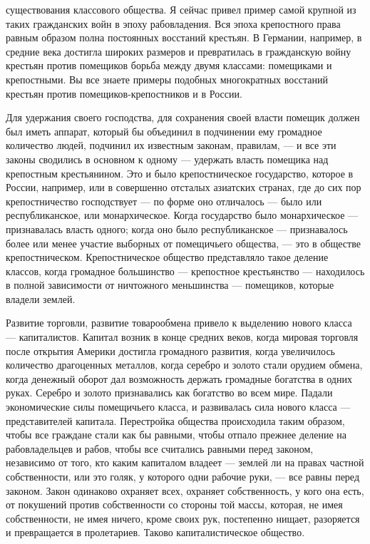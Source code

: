 \documentclass[12pt]{article}
\newcommand{\parnum}{(\arabic{parcount})}
\newcounter{parcount}
\newenvironment{parnumbers}{%
  \par%
  \everypar{\noindent \stepcounter{parcount}\marginpar[]{\parnum}}%
}{}
\begin{document}
\begin{parnumbers}
существования классового общества. Я сейчас привел пример самой крупной из таких гражданских войн в эпоху рабовладения. Вся эпоха крепостного права равным образом полна постоянных восстаний крестьян. В Германии, например, в средние века достигла широких размеров и превратилась в гражданскую войну крестьян против помещиков борьба между двумя классами: помещиками и крепостными. Вы все знаете примеры подобных многократных восстаний крестьян против помещиков-крепостников и в России.

Для удержания своего господства, для сохранения своей власти помещик должен был иметь аппарат, который бы объединил в подчинении ему громадное количество людей, подчинил их известным законам, правилам, — и все эти законы сводились в основном к одному — удержать власть помещика над крепостным крестьянином. Это и было крепостническое государство, которое в России, например, или в совершенно отсталых азиатских странах, где до сих пор крепостничество господствует — по форме оно отличалось — было или республиканское, или монархическое. Когда государство было монархическое — признавалась власть одного; когда оно было республиканское — признавалось более или менее участие выборных от помещичьего общества, — это в обществе крепостническом. Крепостническое общество представляло такое деление классов, когда громадное большинство — крепостное крестьянство — находилось в полной зависимости от ничтожного меньшинства — помещиков, которые владели землей.

Развитие торговли, развитие товарообмена привело к выделению нового класса — капиталистов. Капитал возник в конце средних веков, когда мировая торговля после открытия Америки достигла громадного развития, когда увеличилось количество драгоценных металлов, когда серебро и золото стали орудием обмена, когда денежный оборот дал возможность держать громадные богатства в одних руках. Серебро и золото признавались как богатство во всем мире. Падали экономические силы помещичьего класса, и развивалась сила нового класса — представителей капитала. Перестройка общества происходила таким образом, чтобы все граждане стали как бы равными, чтобы отпало прежнее деление на рабовладельцев и рабов, чтобы все считались равными перед законом, независимо от того, кто каким капиталом владеет — землей ли на правах частной собственности, или это голяк, у которого одни рабочие руки, — все равны перед законом. Закон одинаково охраняет всех, охраняет собственность, у кого она есть, от покушений против собственности со стороны той массы, которая, не имея собственности, не имея ничего, кроме своих рук, постепенно нищает, разоряется и превращается в пролетариев. Таково капиталистическое общество.


\end{parnumbers}
\end{document}
